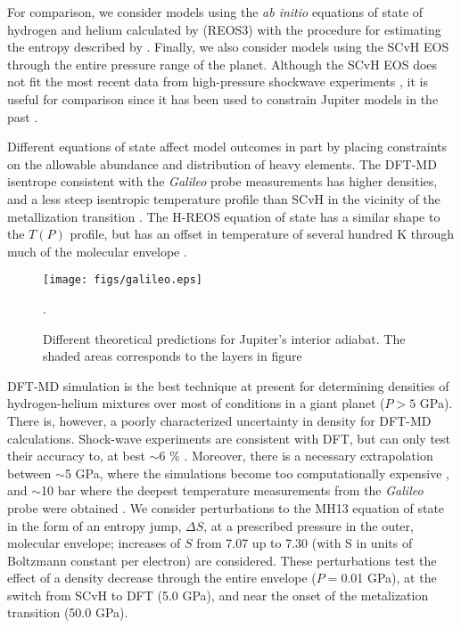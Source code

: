 For comparison, we consider  models using the \textit{ab initio} equations of
state of hydrogen and helium calculated by \citet{becker2013}(REOS3) with the
procedure for estimating the entropy described by \citet{miguel2016}. Finally,
we also consider models using the SCvH EOS through the entire pressure range of
the planet.  Although the SCvH EOS does not fit the most recent data from
high-pressure shockwave experiments \citep{hubbard2016,miguel2016}, it is 
useful for comparison since it has been used to constrain Jupiter models
in the past \citep[e.g.][]{Saumon2004}.  

Different equations of state affect model outcomes in part by placing
constraints on the allowable abundance and distribution of heavy elements. The
DFT-MD isentrope consistent with the \textit{Galileo} probe measurements has
higher densities, and a less steep isentropic temperature profile than SCvH in
the vicinity of the metallization transition
\citep{militzer2013a,militzer2016}. The H-REOS equation of state has a similar
shape to the $T(P)$ profile, but has an offset in temperature of several
hundred K through much of the molecular envelope
\citep{Nettelmann2012,hubbard2016,miguel2016}. 

\begin{figure}[h]
  \begin{center}
    \noindent\texttt{[image: figs/galileo.eps]}
  \end{center}
  \caption{Different theoretical predictions for Jupiter's interior adiabat. The shaded areas corresponds to the layers
    in figure~\label{fig:galileo_match}}. 
  \label{fig:galileo}
\end{figure}


DFT-MD simulation is the best technique at present for determining
densities of hydrogen-helium mixtures over most of conditions in a giant planet
($P>5$ GPa).  There is, however, a poorly characterized uncertainty in density
for DFT-MD calculations. Shock-wave experiments are consistent with DFT, but
can only test their accuracy to, at best $\sim$6 \%
\citep{Knudson2004,Brygoo2015}.  Moreover, there is a necessary extrapolation
between $\sim$5 GPa, where the simulations become too computationally expensive
\citep{militzer2013a,militzer2013b}, and $\sim$10 bar where the deepest
temperature measurements from the \textit{Galileo} probe were obtained
\citep{Seiff1997}.  We consider perturbations to the MH13 equation of state in
the form of an entropy jump, $\Delta S$, at a prescribed pressure in the outer,
molecular envelope; increases of $S$ from 7.07 up to 7.30 (with S in units of
Boltzmann constant per electron) are considered. These perturbations test the
effect of a density decrease through the entire envelope ($P=$0.01 GPa), at the
switch from SCvH to DFT (5.0 GPa), and near the onset of the metalization
transition (50.0 GPa). 


